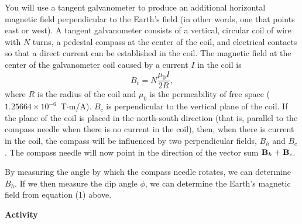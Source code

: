 You will use a tangent galvanometer to produce an additional horizontal
magnetic
field perpendicular to the Earth's field (in other words, one that
points east or west).
A tangent galvanometer consists of a vertical, circular coil of wire
with $N$ turns, a pedestal compass at the center of the coil, and electrical
contacts so that a direct current can be established in the coil.
The magnetic field at the center of the galvanometer coil caused by a current
$I$ in the coil is
\begin{equation}
B_c = N\frac{\mu_0I}{2R},
\end{equation}
where $R$ is the radius of the coil and $\mu _{0}$ is the permeability
of free space ($1.25664 \times 10^{-6}$~T$\cdot$m/A).  $B_c$
is perpendicular to the vertical plane of the coil. If the plane of
the coil is placed in the north-south direction (that is, parallel
to the compass needle when there is no current in the coil), then,
when there is current in the coil, the compass will be influenced
by two perpendicular fields, $B_h$ and $B_c$. 
The compass needle will now point in the direction of the vector
sum ${\bf B}_h+{\bf B}_c$.  

By measuring the angle by which the compass needle rotates, we can determine $B_h$.  
If we then measure the dip angle $\phi$, we can determine
the Earth's magnetic field from equation (1) above.

\pagebreak

\textbf{Activity}

